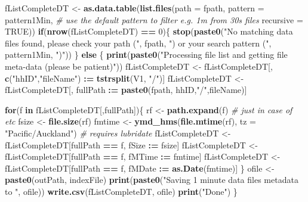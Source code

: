 \documentclass[]{article}
\newenvironment{Shaded}{\begin{snugshade}}{\end{snugshade}}
\newcommand{\KeywordTok}[1]{\textcolor[rgb]{0.13,0.29,0.53}{\textbf{#1}}}
\newcommand{\DataTypeTok}[1]{\textcolor[rgb]{0.13,0.29,0.53}{#1}}
\newcommand{\DecValTok}[1]{\textcolor[rgb]{0.00,0.00,0.81}{#1}}
\newcommand{\StringTok}[1]{\textcolor[rgb]{0.31,0.60,0.02}{#1}}
\newcommand{\CommentTok}[1]{\textcolor[rgb]{0.56,0.35,0.01}{\textit{#1}}}
\newcommand{\OtherTok}[1]{\textcolor[rgb]{0.56,0.35,0.01}{#1}}
\newcommand{\ControlFlowTok}[1]{\textcolor[rgb]{0.13,0.29,0.53}{\textbf{#1}}}
\newcommand{\OperatorTok}[1]{\textcolor[rgb]{0.81,0.36,0.00}{\textbf{#1}}}
\newcommand{\ErrorTok}[1]{\textcolor[rgb]{0.64,0.00,0.00}{\textbf{#1}}}
\newcommand{\NormalTok}[1]{#1}
\begin{document}
\begin{Shaded}
\begin{Highlighting}[]
\NormalTok{fListCompleteDT <-}\StringTok{ }\KeywordTok{as.data.table}\NormalTok{(}\KeywordTok{list.files}\NormalTok{(}\DataTypeTok{path =}\NormalTok{ fpath, }\DataTypeTok{pattern =}\NormalTok{ pattern1Min, }\CommentTok{# use the default pattern to filter e.g. 1m from 30s files}
                                            \DataTypeTok{recursive =} \OtherTok{TRUE}\NormalTok{))}
\ControlFlowTok{if}\NormalTok{(}\KeywordTok{nrow}\NormalTok{(fListCompleteDT) }\OperatorTok{==}\StringTok{ }\DecValTok{0}\NormalTok{)\{}
  \KeywordTok{stop}\NormalTok{(}\KeywordTok{paste0}\NormalTok{(}\StringTok{"No matching data files found, please check your path ("}\NormalTok{, fpath, }\StringTok{") or your search pattern ("}\NormalTok{, pattern1Min, }\StringTok{")"}\NormalTok{))}
\NormalTok{\} }\ControlFlowTok{else}\NormalTok{ \{}
  \KeywordTok{print}\NormalTok{(}\KeywordTok{paste0}\NormalTok{(}\StringTok{"Processing file list and getting file meta-data (please be patient)"}\NormalTok{))}
\NormalTok{  fListCompleteDT <-}\StringTok{ }\NormalTok{fListCompleteDT[, }\KeywordTok{c}\NormalTok{(}\StringTok{"hhID"}\NormalTok{,}\StringTok{"fileName"}\NormalTok{) }\OperatorTok{:}\ErrorTok{=}\StringTok{ }\KeywordTok{tstrsplit}\NormalTok{(V1, }\StringTok{"/"}\NormalTok{)]}
\NormalTok{  fListCompleteDT <-}\StringTok{ }\NormalTok{fListCompleteDT[, fullPath }\OperatorTok{:}\ErrorTok{=}\StringTok{ }\KeywordTok{paste0}\NormalTok{(fpath, hhID,}\StringTok{"/"}\NormalTok{,fileName)]}
  
  \ControlFlowTok{for}\NormalTok{(f }\ControlFlowTok{in}\NormalTok{ fListCompleteDT[,fullPath])\{}
\NormalTok{    rf <-}\StringTok{ }\KeywordTok{path.expand}\NormalTok{(f) }\CommentTok{# just in case of ~ etc}
\NormalTok{    fsize <-}\StringTok{ }\KeywordTok{file.size}\NormalTok{(rf)}
\NormalTok{    fmtime <-}\StringTok{ }\KeywordTok{ymd_hms}\NormalTok{(}\KeywordTok{file.mtime}\NormalTok{(rf), }\DataTypeTok{tz =} \StringTok{"Pacific/Auckland"}\NormalTok{) }\CommentTok{# requires lubridate}
\NormalTok{    fListCompleteDT <-}\StringTok{ }\NormalTok{fListCompleteDT[fullPath }\OperatorTok{==}\StringTok{ }\NormalTok{f, fSize }\OperatorTok{:}\ErrorTok{=}\StringTok{ }\NormalTok{fsize]}
\NormalTok{    fListCompleteDT <-}\StringTok{ }\NormalTok{fListCompleteDT[fullPath }\OperatorTok{==}\StringTok{ }\NormalTok{f, fMTime }\OperatorTok{:}\ErrorTok{=}\StringTok{ }\NormalTok{fmtime]}
\NormalTok{    fListCompleteDT <-}\StringTok{ }\NormalTok{fListCompleteDT[fullPath }\OperatorTok{==}\StringTok{ }\NormalTok{f, fMDate }\OperatorTok{:}\ErrorTok{=}\StringTok{ }\KeywordTok{as.Date}\NormalTok{(fmtime)]}
\NormalTok{  \}}
\NormalTok{  ofile <-}\StringTok{ }\KeywordTok{paste0}\NormalTok{(outPath, indexFile)}
  \KeywordTok{print}\NormalTok{(}\KeywordTok{paste0}\NormalTok{(}\StringTok{"Saving 1 minute data files metadata to "}\NormalTok{, ofile))}
  \KeywordTok{write.csv}\NormalTok{(fListCompleteDT, ofile)}
  \KeywordTok{print}\NormalTok{(}\StringTok{"Done"}\NormalTok{)}
\NormalTok{\}}
\end{Highlighting}
\end{Shaded}
\end{document}
